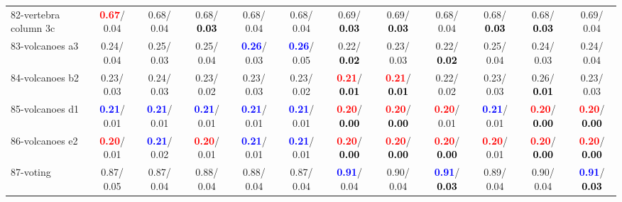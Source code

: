 \begin{table}[h]
\begin{center}
{\begin{tabular}{lc|c|c|c|c|c|c|c|c|c|c}
82-vertebra column 3c & \textcolor{red}{\textbf{  0.67}}/  0.04 &   0.68/  0.04 &   0.68/\textcolor{black}{\textbf{  0.03}} &   0.68/  0.04 &   0.68/  0.04 &   0.69/\textcolor{black}{\textbf{  0.03}} &   0.69/\textcolor{black}{\textbf{  0.03}} &   0.68/  0.04 &   0.68/\textcolor{black}{\textbf{  0.03}} &   0.68/\textcolor{black}{\textbf{  0.03}} &   0.69/  0.04 \\
83-volcanoes a3 &   0.24/  0.04 &   0.25/  0.03 &   0.25/  0.04 & \textcolor{blue}{\textbf{  0.26}}/  0.03 & \textcolor{blue}{\textbf{  0.26}}/  0.05 &   0.22/\textcolor{black}{\textbf{  0.02}} &   0.23/  0.03 &   0.22/\textcolor{black}{\textbf{  0.02}} &   0.25/  0.04 &   0.24/  0.03 &   0.24/  0.04 \\
84-volcanoes b2 &   0.23/  0.03 &   0.24/  0.03 &   0.23/  0.02 &   0.23/  0.03 &   0.23/  0.02 & \textcolor{red}{\textbf{  0.21}}/\textcolor{black}{\textbf{  0.01}} & \textcolor{red}{\textbf{  0.21}}/\textcolor{black}{\textbf{  0.01}} &   0.22/  0.02 &   0.23/  0.03 &   0.26/\textcolor{black}{\textbf{  0.01}} &   0.23/  0.03 \\
85-volcanoes d1 & \textcolor{blue}{\textbf{  0.21}}/  0.01 & \textcolor{blue}{\textbf{  0.21}}/  0.01 & \textcolor{blue}{\textbf{  0.21}}/  0.01 & \textcolor{blue}{\textbf{  0.21}}/  0.01 & \textcolor{blue}{\textbf{  0.21}}/  0.01 & \textcolor{red}{\textbf{  0.20}}/\textcolor{black}{\textbf{  0.00}} & \textcolor{red}{\textbf{  0.20}}/\textcolor{black}{\textbf{  0.00}} & \textcolor{red}{\textbf{  0.20}}/  0.01 & \textcolor{blue}{\textbf{  0.21}}/  0.01 & \textcolor{red}{\textbf{  0.20}}/\textcolor{black}{\textbf{  0.00}} & \textcolor{red}{\textbf{  0.20}}/\textcolor{black}{\textbf{  0.00}} \\ \hline
86-volcanoes e2 & \textcolor{red}{\textbf{  0.20}}/  0.01 & \textcolor{blue}{\textbf{  0.21}}/  0.02 & \textcolor{red}{\textbf{  0.20}}/  0.01 & \textcolor{blue}{\textbf{  0.21}}/  0.01 & \textcolor{blue}{\textbf{  0.21}}/  0.01 & \textcolor{red}{\textbf{  0.20}}/\textcolor{black}{\textbf{  0.00}} & \textcolor{red}{\textbf{  0.20}}/\textcolor{black}{\textbf{  0.00}} & \textcolor{red}{\textbf{  0.20}}/\textcolor{black}{\textbf{  0.00}} & \textcolor{red}{\textbf{  0.20}}/  0.01 & \textcolor{red}{\textbf{  0.20}}/\textcolor{black}{\textbf{  0.00}} & \textcolor{red}{\textbf{  0.20}}/\textcolor{black}{\textbf{  0.00}} \\
87-voting &   0.87/  0.05 &   0.87/  0.04 &   0.88/  0.04 &   0.88/  0.04 &   0.87/  0.04 & \textcolor{blue}{\textbf{  0.91}}/  0.04 &   0.90/  0.04 & \textcolor{blue}{\textbf{  0.91}}/\textcolor{black}{\textbf{  0.03}} &   0.89/  0.04 &   0.90/  0.04 & \textcolor{blue}{\textbf{  0.91}}/\textcolor{black}{\textbf{  0.03}} \\

\end{tabular}}
\end{center}
\end{table}
